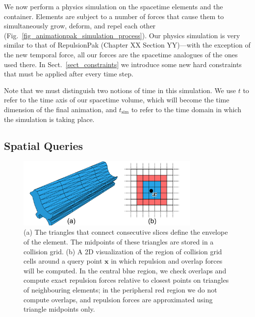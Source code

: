 
We now perform a physics simulation on the spacetime elements and the 
container.  Elements are subject to a number of forces that cause them
to simultaneously grow, deform, and repel each other
(Fig.~\ref{fig_animationpak_simulation_process}).
Our physics simulation is very similar to that of 
RepulsionPak (Chapter XX Section YY)---with the exception of the new temporal
force, all our forces are the spacetime analogues of the ones used
there.  In Sect.~\ref{sect_constraints} we introduce some new hard
constraints that must be applied after every time step.

Note that we must distinguish two notions of time in this simulation.  We use
$t$ to refer to the time axis of our spacetime volume, which will become
the time dimension of the final animation, and $t_\mathrm{sim}$ to
refer to the time domain in which the simulation is taking place.

\subsection{Spatial Queries}
\label{animationpak_spatial_queries}

\begin{figure}
\centering
\includegraphics[width=0.8\textwidth]{figures/animationpak/collision_grid.pdf} 
\caption[An envelope and a collision grid]
{\label{fig_animationpak_collision_grid} 
(a) The triangles that connect consecutive slices define the envelope of the
element.  The midpoints of these triangles are stored in a collision grid.
(b) A 2D visualization of the region of collision
grid cells around a query point 
$\bm{x}$ 
in which repulsion and overlap forces will be computed.  In the central blue
region, we check overlaps and compute exact repulsion forces relative to
closest points on triangles of neighbouring elements; in the peripheral
red region we do not compute overlaps, and repulsion forces are approximated
using triangle midpoints only.}
\end{figure}

